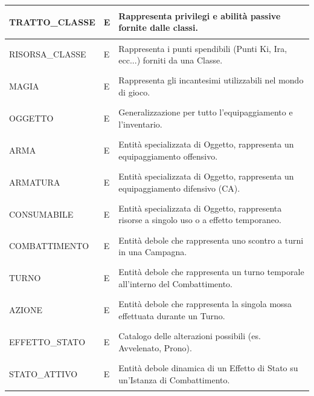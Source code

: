 \documentclass[a4paper,12pt]{report}
\begin{document}
\begin{longtable}{@{} >{\bfseries\raggedright\arraybackslash}p{} >{\centering\arraybackslash}p{} >{\raggedright\arraybackslash}p{} @{}}
    TRATTO\_CLASSE & E & Rappresenta privilegi e abilità passive fornite dalle classi. \\ \midrule 
    RISORSA\_CLASSE & E & Rappresenta i punti spendibili (Punti Ki, Ira, ecc...) forniti da una Classe. \\ \midrule 
    MAGIA & E & Rappresenta gli incantesimi utilizzabili nel mondo di gioco. \\ \midrule 
    OGGETTO & E & Generalizzazione per tutto l'equipaggiamento e l'inventario. \\ \midrule 
    ARMA & E & Entità specializzata di Oggetto, rappresenta un equipaggiamento offensivo. \\ \midrule 
    ARMATURA & E & Entità specializzata di Oggetto, rappresenta un equipaggiamento difensivo (CA). \\ \midrule 
    CONSUMABILE & E & Entità specializzata di Oggetto, rappresenta risorse a singolo uso o a effetto temporaneo. \\ \midrule 
    COMBATTIMENTO & E & Entità debole che rappresenta uno scontro a turni in una Campagna. \\ \midrule 
    TURNO & E & Entità debole che rappresenta un turno temporale all'interno del Combattimento. \\ \midrule 
    AZIONE & E & Entità debole che rappresenta la singola mossa effettuata durante un Turno. \\ \midrule 
    EFFETTO\_STATO & E & Catalogo delle alterazioni possibili (es. Avvelenato, Prono). \\ \midrule
    STATO\_ATTIVO & E & Entità debole dinamica di un Effetto di Stato su un'Istanza di Combattimento. \\ \midrule


\end{longtable}
\end{document}
